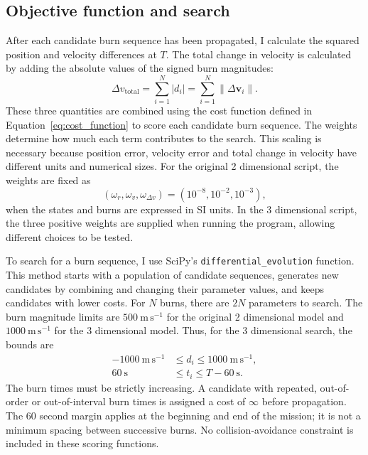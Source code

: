 \documentclass[11pt,letterpaper]{article}
\begin{document}
\subsection{Objective function and search}
After each candidate burn sequence has been propagated, I calculate
the squared position and velocity differences at $T$. The total change
in velocity is calculated by adding the absolute values of the signed
burn magnitudes:
\begin{equation}
  \Delta v_{\mathrm{total}}=\sum_{i=1}^{N}|d_i|
  =\sum_{i=1}^{N}\|\Delta\mathbf v_i\|.
\end{equation}
These three quantities are combined using the cost function defined in
Equation~\eqref{eq:cost_function} to score each candidate burn sequence.
The weights determine how much each term contributes to the search.
This scaling is necessary because position error, velocity error and
total change in velocity have different units and numerical sizes.
For the original 2 dimensional script, the weights are fixed as
\begin{equation}
  (\omega_r,\omega_v,\omega_{\Delta v})
  =(10^{-8},10^{-2},10^{-3}),
\end{equation}
when the states and burns are expressed in SI units. In the
3 dimensional script, the three positive weights are supplied when
running the program, allowing different choices to be tested.

To search for a burn sequence, I use SciPy's
\texttt{differential\_evolution} function. This method starts with a
population of candidate sequences, generates new candidates by
combining and changing their parameter values, and keeps candidates
with lower costs. For $N$ burns, there are $2N$ parameters to search.
The burn magnitude limits are $500\ \mathrm{m\,s^{-1}}$ for the original
2 dimensional model and $1000\ \mathrm{m\,s^{-1}}$ for the 3 dimensional
model. Thus, for the 3 dimensional search, the bounds are
\begin{align}
  -1000\ \mathrm{m\,s^{-1}} &\leq d_i\leq1000\ \mathrm{m\,s^{-1}},\\
  60\ \mathrm{s} &\leq t_i\leq T-60\ \mathrm{s}.
\end{align}
The burn times must be strictly increasing. A candidate with repeated,
out-of-order or out-of-interval burn times is assigned a cost of
$\infty$ before propagation. The 60 second margin applies at the
beginning and end of the mission; it is not a minimum spacing between
successive burns. No collision-avoidance constraint is included in
these scoring functions.
\end{document}
